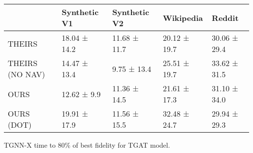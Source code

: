 \begin{tabular}{lllll}
\toprule
 & Synthetic V1 & Synthetic V2 & Wikipedia & Reddit \\
\midrule
THEIRS & 18.04 ± 14.2 & 11.68 ± 11.7 & 20.12 ± 19.7 & 30.06 ± 29.4 \\
THEIRS (NO NAV) & 14.47 ± 13.4 & 9.75 ± 13.4 & 25.51 ± 19.7 & 33.62 ± 31.5 \\
OURS & 12.62 ± 9.9 & 11.36 ± 14.5 & 21.61 ± 17.3 & 31.10 ± 34.0 \\
OURS (DOT) & 19.91 ± 17.9 & 11.56 ± 15.5 & 32.48 ± 24.7 & 29.94 ± 29.3 \\
\bottomrule
\end{tabular}
\caption{\label{tab:tgat_time}TGNN-X time to 80\% of best fidelity for TGAT model.}

